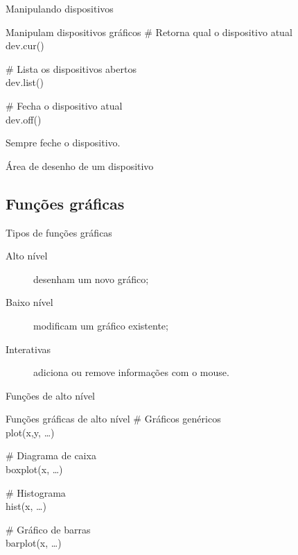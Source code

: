 \documentclass{beamer}
\begin{document}
\begin{frame}{Manipulando dispositivos}

  \begin{block}{Manipulam dispositivos gráficos}
\# Retorna qual o dispositivo atual\\
dev.cur() \\ \vspace{10pt}

\# Lista os dispositivos abertos \\
dev.list() \\ \vspace{10pt}

\# Fecha o dispositivo atual\\
dev.off() \\ \vspace{10pt}   
  \end{block}
   Sempre feche o dispositivo.
\end{frame}


\begin{frame}{Área de desenho de um dispositivo}
\centering
{}
 \end{frame}

\subsection{Funções gráficas}
\begin{frame}{Tipos de funções gráficas}
  \begin{description}
  \item[Alto nível] desenham um novo gráfico;
  \item[Baixo nível] modificam um gráfico existente;
  \item[Interativas] adiciona ou remove informações com o mouse.
  \end{description}
\end{frame}

\begin{frame}{Funções de alto nível}
  \begin{block}{Funções gráficas de alto nível}
\# Gráficos genéricos \\ 
plot(x,y, \dots)\\ \vspace{10pt}

\# Diagrama de caixa \\
boxplot(x, \ldots)\\\vspace{10pt}

\# Histograma\\
hist(x, \ldots)\\ \vspace{10pt}

\# Gráfico de barras\\
barplot(x, \ldots)\\
\end{block}  
\end{frame}
\end{document}
